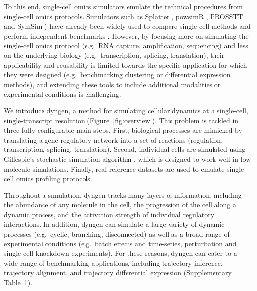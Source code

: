 \documentclass[
  table,
  10pt,
  a4paper]{article}
\begin{document}
To this end, single-cell omics simulators emulate the technical
procedures from single-cell omics protocols. Simulators such as Splatter
\autocite{zappia_splattersimulationsinglecell_2017}, powsimR
\autocite{vieth_powsimrpoweranalysis_2017}, PROSSTT
\autocite{papadopoulos_prossttprobabilisticsimulation_2019} and SymSim
\autocite{zhang_simulatingmultiplefaceted_2019}) have already been
widely used to compare single-cell methods
\autocite{street_slingshotcelllineage_2018,parra_reconstructingcomplexlineage_2019,lummertzdarocha_reconstructioncomplexsinglecell_2018,lin_scclassifysamplesize_2020}
and perform independent benchmarks
\autocite{duo_systematicperformanceevaluation_2018,saelens_comparisonsinglecelltrajectory_2019,soneson_biasrobustnessscalability_2018}.
However, by focusing more on simulating the single-cell omics protocol
(e.g.~RNA capture, amplification, sequencing) and less on the underlying
biology (e.g.~transcription, splicing, translation), their applicability
and reusability is limited towards the specific application for which
they were designed (e.g.~benchmarking clustering or differential
expression methods), and extending these tools to include additional
modalities or experimental conditions is challenging.

We introduce dyngen, a method for simulating cellular dynamics at a
single-cell, single-transcript resolution (Figure~\ref{fig:overview}).
This problem is tackled in three fully-configurable main steps. First,
biological processes are mimicked by translating a gene regulatory
network into a set of reactions (regulation, transcription, splicing,
translation). Second, individual cells are simulated using Gillespie's
stochastic simulation algorithm
\autocite{gillespie_exactstochasticsimulation_1977}, which is designed
to work well in low-molecule simulations. Finally, real reference
datasets are used to emulate single-cell omics profiling protocols.

Throughout a simulation, dyngen tracks many layers of information,
including the abundance of any molecule in the cell, the progression of
the cell along a dynamic process, and the activation strength of
individual regulatory interactions. In addition, dyngen can simulate a
large variety of dynamic processes (e.g.~cyclic, branching,
disconnected) as well as a broad range of experimental conditions
(e.g.~batch effects and time-series, perturbation and single-cell
knockdown experiments). For these reasons, dyngen can cater to a wide
range of benchmarking applications, including trajectory inference,
trajectory alignment, and trajectory differential expression
(Supplementary Table~1).
\end{document}
